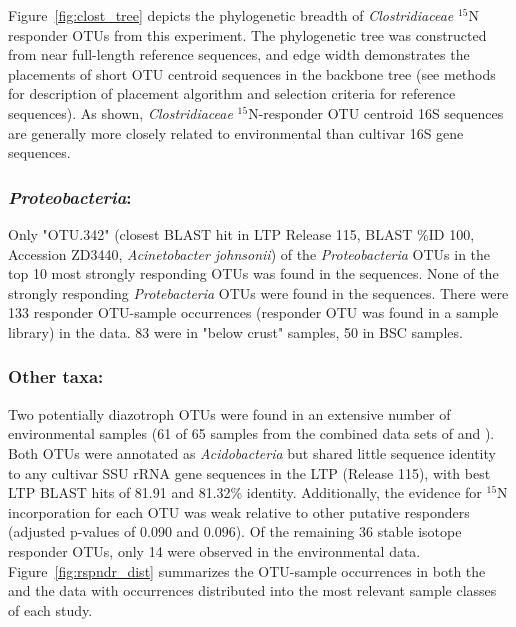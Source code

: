 Figure~\ref{fig:clost_tree} depicts the phylogenetic breadth of
\textit{Clostridiaceae} $^{15}$N responder OTUs from this experiment. The
phylogenetic tree was constructed from near full-length reference sequences,
and edge width demonstrates the placements of short OTU centroid sequences in
the backbone tree (see methods for description of placement algorithm and
selection criteria for reference sequences). As shown,
\textit{Clostridiaceae} $^{15}$N-responder OTU centroid 16S sequences are
generally more closely related to environmental than cultivar 16S gene
sequences.   

\subsubsection{\textbf{\textit{Proteobacteria}:}} Only "OTU.342" (closest
BLAST hit in LTP Release 115, BLAST \%ID 100, Accession ZD3440,
\textit{Acinetobacter johnsonii}) of the \textit{Proteobacteria} OTUs in the
top 10 most strongly responding OTUs was found in the
\citet{Garcia_Pichel_2013} sequences. None of the strongly responding
\textit{Protebacteria} OTUs were found in the \citet{Steven_2013} sequences.
There were 133 responder OTU-sample occurrences (responder OTU was found in a
sample library) in the \citet{Steven_2013} data.  83 were in "below crust"
samples, 50 in BSC samples.

\subsubsection{\textbf{Other taxa:}} Two potentially diazotroph OTUs were found
in an extensive number of environmental samples (61 of 65 samples from the
combined data sets of \citet{Garcia_Pichel_2013} and \citet{Steven_2013}).
Both OTUs were annotated as \textit{Acidobacteria} but shared little sequence
identity to any cultivar SSU rRNA gene sequences in the LTP (Release 115),
with best LTP BLAST hits of 81.91 and 81.32\% identity. Additionally, the
evidence for $^{15}$N incorporation for each OTU was weak relative to other
putative responders (adjusted p-values of 0.090 and 0.096). Of the remaining
36 stable isotope responder OTUs, only 14 were observed in the environmental
data.  Figure~\ref{fig:rspndr_dist} summarizes the OTU-sample occurrences in
both the \citet{Steven_2013} and the \citet{Garcia_Pichel_2013} data with
occurrences distributed into the most relevant sample classes of each study.

